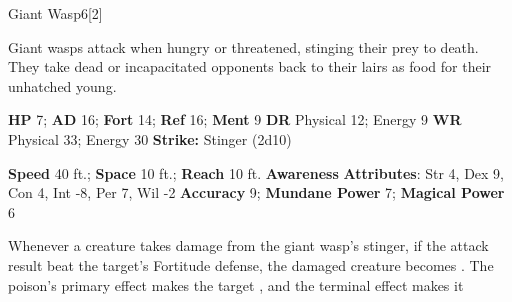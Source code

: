   \begin{monsection}{Giant Wasp}{6}[2]
    \vspace{-1em}\vspace{-1em}
    \vspace{0em}

    
      Giant wasps attack when hungry or threatened, stinging their prey to death.
      They take dead or incapacitated opponents back to their lairs as food for their unhatched young.
    

    \begin{spellcontent}
      \begin{spelltargetinginfo}
        \pari \textbf{HP} 7;
          \textbf{AD} 16;
          \textbf{Fort} 14;
          \textbf{Ref} 16;
          \textbf{Ment} 9
        \pari \textbf{DR} Physical 12; Energy 9
        \pari \textbf{WR} Physical 33; Energy 30
        \pari \textbf{Strike:}
            Stinger  (2d10)
      \end{spelltargetinginfo}
    \end{spellcontent}
    \begin{monsterfooter}
      \pari \textbf{Speed} 40 ft.;
        \textbf{Space} 10 ft.;
        \textbf{Reach} 10 ft.
      \pari \textbf{Awareness} 
      \pari \textbf{Attributes}:
        Str 4, Dex 9,
        Con 4, Int -8,
        Per 7, Wil -2
      \pari \textbf{Accuracy} 9;
        \textbf{Mundane Power} 7;
      \textbf{Magical Power} 6
    \end{monsterfooter}
  \end{monsection}
    Whenever a creature takes damage from the giant wasp's stinger,
      if the attack result beat the target's Fortitude defense,
      the damaged creature becomes .
    The poison's primary effect makes the target , and the terminal effect makes it 
  
